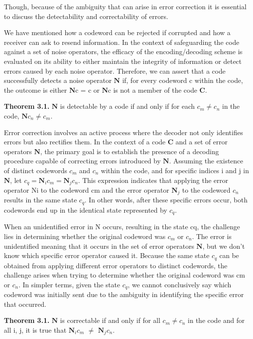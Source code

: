 \documentclass[12pt]{report}
\begin{document}
	\begin{minipage}{1 \textwidth}
		
		Though, because of the ambiguity that can arise in error correction it is essential to discuss the detectability and correctability of errors. \newline
		
		We have mentioned how a codeword can be rejected if corrupted and how a receiver can ask to resend information. In the context of safeguarding the code against a set of noise operators, the efficacy of the encoding/decoding scheme is evaluated on its ability to either maintain the integrity of information or detect errors caused by each noise operator. Therefore, we can assert that a code successfully detects a noise operator $\textbf{N}$ if, for every codeword c within the code, the outcome is either $\textbf{N}$c = c or $\textbf{N}$c is not a member of the code $\textbf{C}$.\newline
		
		\textbf{Theorem 3.1.} $\textbf{N}$ is detectable by a code if and only if for each $c_m \neq c_n$ in the code, $\textbf{N}c_n \neq c_m $.\newline
		
		
		Error correction involves an active process where the decoder not only identifies errors but also rectifies them. 
		In the context of a code $\textbf{C}$ and a set of error operators $\textbf{N}$, the primary goal is to establish the presence of a decoding procedure capable of correcting errors introduced by $\textbf{N}$. 
		Assuming the existence of distinct codewords $c_m$ and $c_n$ within the code, and for specific indices i and j in $\textbf{N}$, let $c_q = \textbf{N}_ic_m = \textbf{N}_jc_n$. 
		This expression indicates that applying the error operator Ni to the codeword cm and the error operator $\textbf{N}_j$ to the codeword $c_n$ results in the same state $c_q$. In other words, after these specific errors occur, both codewords end up in the identical state represented by $c_q$. \newline
		
		When an unidentified error in N occurs, resulting in the state cq, the challenge lies in determining whether the original codeword was $c_m$ or $c_n$. 
		The error is unidentified meaning that it occurs in the set of error operators $\textbf{N}$, but we don't know which specific error operator caused it.  Because the same state $c_q$ can be obtained from applying different error operators to distinct codewords, the challenge arises when trying to determine whether the original codeword was cm or $c_n$. In simpler terms, given the state $c_q$, we cannot conclusively say which codeword was initially sent due to the ambiguity in identifying the specific error that occurred. \newline 
		
		\textbf{Theorem 3.1.} $\textbf{N}$ is correctable if and only if for all $c_m \neq c_n$ in the code and for all i, j, it is true that $\textbf{N}_ic_m$ $\neq$ $\textbf{N}_jc_n$. \newline
		
		
		
	\end{minipage}
	
\end{document}
